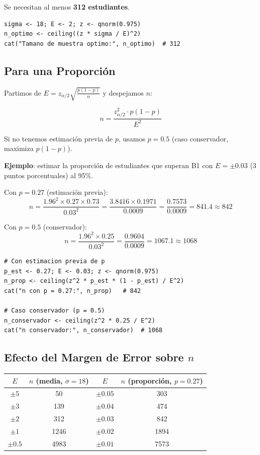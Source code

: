 \documentclass[11pt, a4paper]{article}
\begin{document}
Se necesitan al menos \textbf{312 estudiantes}.

\begin{lstlisting}
sigma <- 18; E <- 2; z <- qnorm(0.975)
n_optimo <- ceiling((z * sigma / E)^2)
cat("Tamano de muestra optimo:", n_optimo)  # 312
\end{lstlisting}

\subsection{Para una Proporci\'on}

Partimos de $E = z_{\alpha/2} \sqrt{\frac{p(1-p)}{n}}$ y despejamos $n$:

\[
\boxed{n = \frac{z_{\alpha/2}^2 \cdot p(1-p)}{E^2}}
\]

Si no tenemos estimaci\'on previa de $p$, usamos $p = 0.5$ (caso conservador, maximiza $p(1-p)$).

\textbf{Ejemplo}: estimar la proporci\'on de estudiantes que superan B1 con $E = \pm 0.03$ (3 puntos porcentuales) al 95\%.

Con $p = 0.27$ (estimaci\'on previa):
\[
n = \frac{1.96^2 \times 0.27 \times 0.73}{0.03^2} = \frac{3.8416 \times 0.1971}{0.0009} = \frac{0.7573}{0.0009} = 841.4 \approx 842
\]

Con $p = 0.5$ (conservador):
\[
n = \frac{1.96^2 \times 0.25}{0.03^2} = \frac{0.9604}{0.0009} = 1067.1 \approx 1068
\]

\begin{lstlisting}
# Con estimacion previa de p
p_est <- 0.27; E <- 0.03; z <- qnorm(0.975)
n_prop <- ceiling(z^2 * p_est * (1 - p_est) / E^2)
cat("n con p = 0.27:", n_prop)   # 842

# Caso conservador (p = 0.5)
n_conservador <- ceiling(z^2 * 0.25 / E^2)
cat("n conservador:", n_conservador)  # 1068
\end{lstlisting}

\subsection{Efecto del Margen de Error sobre $n$}

\begin{center}
\begin{tabular}{cccc}
\toprule
$E$ & $n$ (media, $\sigma=18$) & $E$ & $n$ (proporci\'on, $p=0.27$) \\
\midrule
$\pm 5$ & 50 & $\pm 0.05$ & 303 \\
$\pm 3$ & 139 & $\pm 0.04$ & 474 \\
$\pm 2$ & 312 & $\pm 0.03$ & 842 \\
$\pm 1$ & 1246 & $\pm 0.02$ & 1894 \\
$\pm 0.5$ & 4983 & $\pm 0.01$ & 7573 \\
\bottomrule
\end{tabular}
\end{center}
\end{document}
